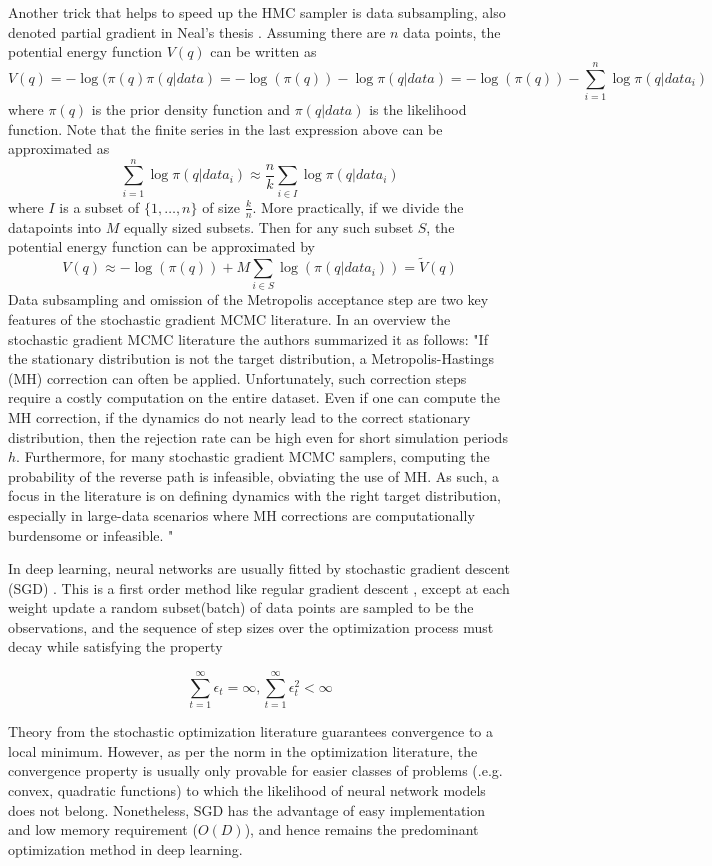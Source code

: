 \documentclass[12pt]{report}
\begin{document}
Another trick that helps to speed up the HMC sampler is data subsampling, also denoted partial gradient in Neal's thesis \cite{neal2012bayesian}.
Assuming there are $n$ data points, the potential energy function $V(q)$ can be written as 
\[ V(q) = -\log( \pi(q) \pi(q|data) = -\log(\pi(q)) -\log \pi(q|data) = -\log(\pi(q)) - \sum_{i=1}^n \log \pi(q|data_i) \]
where $\pi(q)$ is the prior density function and $\pi(q|data)$ is the likelihood function. Note that the finite series in the last expression above can be approximated as 
\[ \sum_{i=1}^n \log \pi(q|data_i) \approx \frac{n}{k} \sum_{i \in I} \log \pi(q|data_i) \]
where $I$ is a subset of $\{1,\dots, n\}$ of size $\frac{k}{n}$. 
More practically, if we divide the datapoints into $M$ equally sized subsets. Then for any such subset $S$, the potential energy function can be approximated by 
\[ V(q) \approx    -\log(\pi(q)) + M \sum_{i \in S} \log(\pi(q|data_i)) = \tilde{V}(q) \] Data subsampling and omission of the Metropolis acceptance step are two key features of the stochastic gradient MCMC literature. In an overview the stochastic gradient MCMC literature 
the authors summarized it as follows:
 "If the stationary distribution is not the target distribution, a Metropolis-Hastings (MH) correction can often be applied. Unfortunately, such correction steps require a costly computation on the entire
dataset. Even if one can compute the MH correction, if the dynamics do not nearly lead to the correct stationary distribution, then the rejection rate can be high even for short simulation periods $h$. Furthermore, for many stochastic gradient MCMC samplers, computing the probability of the reverse path is infeasible, obviating the use of MH. As such, a focus in the literature is on defining dynamics with the right target distribution, especially in large-data scenarios where MH corrections are computationally burdensome or infeasible.
"\cite{ma2015complete}

In deep learning, neural networks are usually fitted by stochastic gradient descent (SGD) \cite{ngiam2011optimization}.
This is a first order method like regular gradient descent \cite{wright1999numerical}, except at each weight update a random subset(batch) of data points are sampled to be the  observations, and the sequence of step sizes over the optimization process must decay while satisfying the property

\[ \sum_{t=1}^\infty \epsilon_t = \infty , \sum_{t=1}^\infty \epsilon_t^2 < \infty \]

Theory from the stochastic optimization literature \cite{robbins1951stochastic} guarantees convergence to a local minimum. However, as per the norm in the optimization literature, the convergence property is usually only provable for easier classes of problems (.e.g. convex, quadratic functions) to which the likelihood of neural network models does not belong. Nonetheless, SGD has the advantage of easy implementation and low memory requirement ($O(D)$), and hence remains the predominant optimization method in deep learning.  
\end{document}
